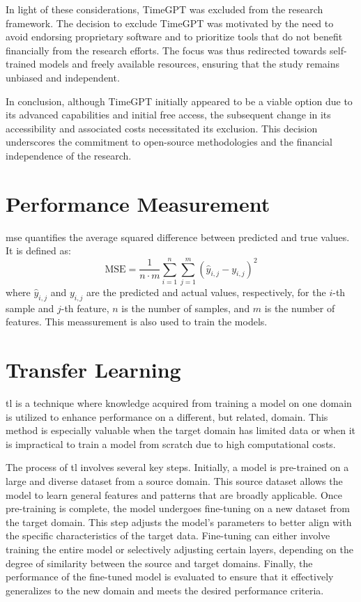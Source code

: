 In light of these considerations, TimeGPT was excluded from the research framework. The decision to exclude TimeGPT was motivated by the need to avoid endorsing proprietary software and to prioritize tools that do not benefit financially from the research efforts. The focus was thus redirected towards self-trained models and freely available resources, ensuring that the study remains unbiased and independent.

In conclusion, although TimeGPT initially appeared to be a viable option due to its advanced capabilities and initial free access, the subsequent change in its accessibility and associated costs necessitated its exclusion. This decision underscores the commitment to open-source methodologies and the financial independence of the research.

\section{Performance Measurement}
\label{sec:performance}
\gls{mse} quantifies the average squared difference between predicted and true values. It is defined as:
\begin{equation}
\text{MSE} = \frac{1}{n \cdot m} \sum_{i=1}^n \sum_{j=1}^m \left( \hat{y}_{i,j} - y_{i,j} \right)^2
\end{equation}
where \(\hat{y}_{i,j}\) and \(y_{i,j}\) are the predicted and actual values, respectively, for the \(i\)-th sample and \(j\)-th feature, \(n\) is the number of samples, and \(m\) is the number of features. This meassurement is also used to train the models.

\section{Transfer Learning}
\label{sect:transfer-learning}

\gls{tl} is a technique where knowledge acquired from training a model on one domain is utilized to enhance performance on a different, but related, domain. This method is especially valuable when the target domain has limited data or when it is impractical to train a model from scratch due to high computational costs.

The process of \gls{tl} involves several key steps. Initially, a model is pre-trained on a large and diverse dataset from a source domain. This source dataset allows the model to learn general features and patterns that are broadly applicable. Once pre-training is complete, the model undergoes fine-tuning on a new dataset from the target domain. This step adjusts the model's parameters to better align with the specific characteristics of the target data. Fine-tuning can either involve training the entire model or selectively adjusting certain layers, depending on the degree of similarity between the source and target domains. Finally, the performance of the fine-tuned model is evaluated to ensure that it effectively generalizes to the new domain and meets the desired performance criteria.

